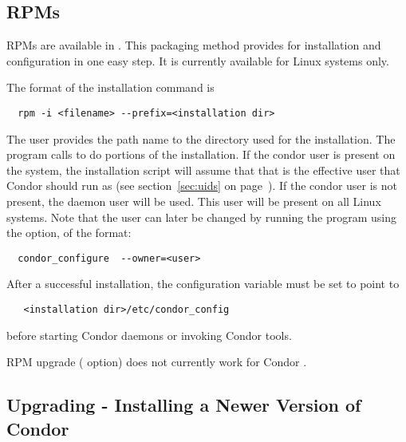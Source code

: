 

\subsection{\label{sec:install-rpms} RPMs}

RPMs are available in \VersionNotice.
This packaging method provides for installation and configuration
in one easy step.
It is currently available for Linux systems only.

The format of the installation command is
\begin{verbatim}
  rpm -i <filename> --prefix=<installation dir>
\end{verbatim}

The user provides the path name to the directory
used for the installation.
The  program calls  to do portions
of the installation.
If the condor user is present on the system,
the installation script will
assume that that is the effective user that Condor should run as
(see 
section~\ref{sec:uids} on
page~\pageref{sec:uids}).
If the condor user is not present,
the daemon user 
will be used.
This user will be present on all Linux systems. 
Note that the user can later be changed by running the 
program using the  option, of the format:
\begin{verbatim}
  condor_configure  --owner=<user>
\end{verbatim}

After a successful installation,
the  configuration 
variable must be set to point to
\begin{verbatim}
   <installation dir>/etc/condor_config
\end{verbatim}
before starting Condor daemons or invoking Condor tools.

RPM upgrade ( option) does not currently
work for Condor \VersionNotice.

\subsection{\label{sec:upgrade-directions}Upgrading - Installing a Newer
Version of Condor}

